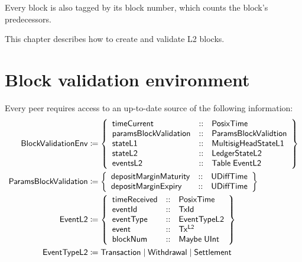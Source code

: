 \documentclass[../hydrozoa.tex]{subfiles}
\begin{document}
Every block is also tagged by its block number, which counts the block's predecessors.

This chapter describes how to create and validate L2 blocks.

\section{Block validation environment}%
\label{h:l2-block-validation-environment}%

Every peer requires access to an up-to-date source of the following information:
\begin{equation*}
\begin{split}
  \mathsf{BlockValidationEnv} &\coloneq \left\{
    \begin{array}{lll}
      \mathsf{timeCurrent} &::& \mathsf{PosixTime} \\
      \mathsf{paramsBlockValidation} &::& \mathsf{ParamsBlockValidtion} \\
      \mathsf{stateL1} &::& \mathsf{MultisigHeadStateL1} \\
      \mathsf{stateL2} &::& \mathsf{LedgerStateL2} \\
      \mathsf{eventsL2} &::& \mathsf{Table} \; \mathsf{EventL2} \\
    \end{array}\right\} \\
  \mathsf{ParamsBlockValidation} &\coloneq \left\{
    \begin{array}{lll}
      \mathsf{depositMarginMaturity} &::& \mathsf{UDiffTime} \\
      \mathsf{depositMarginExpiry} &::& \mathsf{UDiffTime}
    \end{array}\right\} \\
  \mathsf{EventL2} &\coloneq \left\{
    \begin{array}{lll}
      \mathsf{timeReceived} &::& \mathsf{PosixTime} \\
      \mathsf{eventId} &::& \mathsf{TxId} \\
      \mathsf{eventType} &::& \mathsf{EventTypeL2} \\
      \mathsf{event} &::& \mathsf{Tx^{L2}} \\
      \mathsf{blockNum} &::& \mathsf{Maybe} \; \mathsf{UInt}
    \end{array}\right\} \\
  \mathsf{EventTypeL2} &\coloneq \mathsf{Transaction} \mid \mathsf{Withdrawal} \mid \mathsf{Settlement}
\end{split}
\end{equation*}
\end{document}
